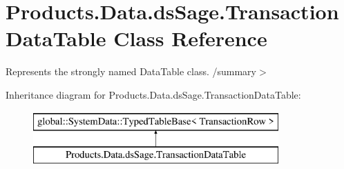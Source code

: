 \hypertarget{class_products_1_1_data_1_1ds_sage_1_1_transaction_data_table}{}\section{Products.\+Data.\+ds\+Sage.\+Transaction\+Data\+Table Class Reference}
\label{class_products_1_1_data_1_1ds_sage_1_1_transaction_data_table}


Represents the strongly named Data\+Table class. /summary$>$  


Inheritance diagram for Products.\+Data.\+ds\+Sage.\+Transaction\+Data\+Table\+:\begin{figure}[H]
\begin{center}
\leavevmode
\includegraphics[height=2.000000cm]{class_products_1_1_data_1_1ds_sage_1_1_transaction_data_table}
\end{center}
\end{figure}
